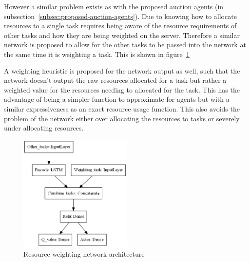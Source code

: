 However a similar problem exists as with the proposed auction agents (in subsection~\ref{subsec:proposed-auction-agents}).
Due to knowing how to allocate resources to a single task requires being aware of the resource requirements of other
tasks and how they are being weighted on the server. Therefore a similar network is proposed to allow for the other tasks
to be passed into the network at the same time it is weighting a task. This is shown in
figure~\ref{fig:resource_weighting_network_architecture}

A weighting heuristic is proposed for the network output as well, such that the network doesn't output the raw
resources allocated for a task but rather a weighted value for the resources needing to allocated for the task.
This has the advantage of being a simpler function to approximate for agents but with a similar expressiveness as an
exact resource usage function. This also avoids the problem of the network either over allocating the resources to tasks
or severely under allocating resources.

\begin{figure}
    \centering
    \includegraphics[width=0.5\textwidth]{figures/2_solution_figs/resource_weighting_network_architecture.png}
    \caption{Resource weighting network architecture}
    \label{fig:resource_weighting_network_architecture}
\end{figure}



